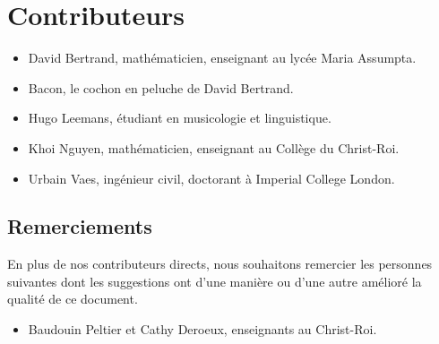 \section*{Contributeurs}

\begin{itemize}
    \item David Bertrand, mathématicien, enseignant au lycée Maria Assumpta.
    \item Bacon, le cochon en peluche de David Bertrand.
    \item Hugo Leemans, étudiant en musicologie et linguistique.
    \item Khoi Nguyen, mathématicien, enseignant au Collège du Christ-Roi.
    \item Urbain Vaes, ingénieur civil, doctorant à Imperial College London.
\end{itemize}

\subsection*{Remerciements}

En plus de nos contributeurs directs,
nous souhaitons remercier les personnes suivantes
dont les suggestions ont d'une manière ou d'une autre amélioré la qualité de ce document.

\begin{itemize}
    \item Baudouin Peltier et Cathy Deroeux, enseignants au Christ-Roi.
\end{itemize}
